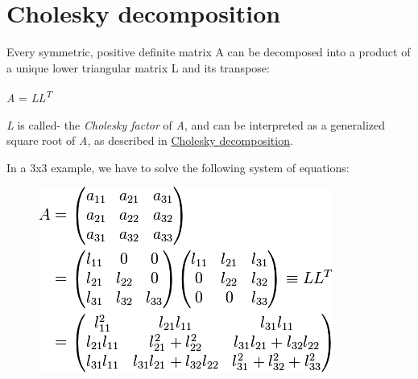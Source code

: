 \pagebreak{}
\section*{Cholesky decomposition}


Every symmetric, positive definite matrix A can be decomposed into a
product of a unique lower triangular matrix L and its transpose:

\emph{A} = \emph{L}\emph{L}\textsuperscript{\emph{T}}

\emph{L} is called- the \emph{Cholesky factor} of \emph{A}, and can be
interpreted as a generalized square root of \emph{A}, as described in
\href{http://en.wikipedia.org/wiki/Cholesky\_decomposition}{Cholesky
decomposition}.

In a 3x3 example, we have to solve the following system of equations:

\begin{figure}[H]
\centering
\includegraphics[scale=.6]{graphics/d9fa28df063d00917f713bd9de134ad5.png}
\end{figure}

